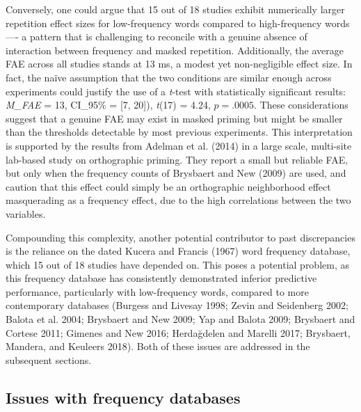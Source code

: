 \documentclass[
]{interact}
\begin{document}
Conversely, one could argue that 15 out of 18 studies exhibit
numerically larger repetition effect sizes for low-frequency words
compared to high-frequency words ---- a pattern that is challenging to
reconcile with a genuine absence of interaction between frequency and
masked repetition. Additionally, the average FAE across all studies
stands at 13 ms, a modest yet non-negligible effect size. In fact, the
naïve assumption that the two conditions are similar enough across
experiments could justify the use of a \emph{t}-test with statistically
significant results: \emph{M\_FAE} = 13, CI\_95\% = {[}7, 20{]}),
\emph{t}(17) = 4.24, \(p=.0005\). These considerations suggest that a
genuine FAE may exist in masked priming but might be smaller than the
thresholds detectable by most previous experiments. This interpretation
is supported by the results from Adelman et al. (2014) in a large scale,
multi-site lab-based study on orthographic priming. They report a small
but reliable FAE, but only when the frequency counts of Brysbaert and
New (2009) are used, and caution that this effect could simply be an
orthographic neighborhood effect masquerading as a frequency effect, due
to the high correlations between the two variables.

Compounding this complexity, another potential contributor to past
discrepancies is the reliance on the dated Kucera and Francis (1967)
word frequency database, which 15 out of 18 studies have depended on.
This poses a potential problem, as this frequency database has
consistently demonstrated inferior predictive performance, particularly
with low-frequency words, compared to more contemporary databases
(Burgess and Livesay 1998; Zevin and Seidenberg 2002; Balota et al.
2004; Brysbaert and New 2009; Yap and Balota 2009; Brysbaert and Cortese
2011; Gimenes and New 2016; Herdağdelen and Marelli 2017; Brysbaert,
Mandera, and Keuleers 2018). Both of these issues are addressed in the
subsequent sections.

\subsection{Issues with frequency databases}\label{sec-study-freq}
\end{document}
